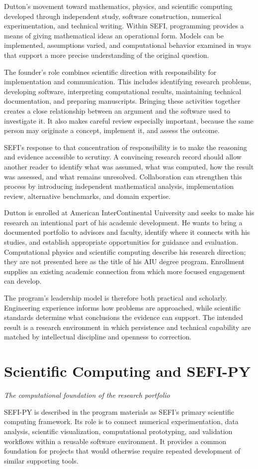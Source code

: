 \documentclass[10pt,letterpaper]{article}
\newcommand{\pageheading}[2]{\clearpage\section{#1}\textit{#2}\par\medskip}
\begin{document}
Dutton's movement toward mathematics, physics, and scientific computing developed through independent study, software construction, numerical experimentation, and technical writing. Within SEFI, programming provides a means of giving mathematical ideas an operational form. Models can be implemented, assumptions varied, and computational behavior examined in ways that support a more precise understanding of the original question.

The founder's role combines scientific direction with responsibility for implementation and communication. This includes identifying research problems, developing software, interpreting computational results, maintaining technical documentation, and preparing manuscripts. Bringing these activities together creates a close relationship between an argument and the software used to investigate it. It also makes careful review especially important, because the same person may originate a concept, implement it, and assess the outcome.

SEFI's response to that concentration of responsibility is to make the reasoning and evidence accessible to scrutiny. A convincing research record should allow another reader to identify what was assumed, what was computed, how the result was assessed, and what remains unresolved. Collaboration can strengthen this process by introducing independent mathematical analysis, implementation review, alternative benchmarks, and domain expertise.

Dutton is enrolled at American InterContinental University and seeks to make his research an intentional part of his academic development. He wants to bring a documented portfolio to advisors and faculty, identify where it connects with his studies, and establish appropriate opportunities for guidance and evaluation. Computational physics and scientific computing describe his research direction; they are not presented here as the title of his AIU degree program. Enrollment supplies an existing academic connection from which more focused engagement can develop.

The program's leadership model is therefore both practical and scholarly. Engineering experience informs how problems are approached, while scientific standards determine what conclusions the evidence can support. The intended result is a research environment in which persistence and technical capability are matched by intellectual discipline and openness to correction.

\pageheading{Scientific Computing and SEFI-PY}{The computational foundation of the research portfolio}
SEFI-PY is described in the program materials as SEFI's primary scientific computing framework. Its role is to connect numerical experimentation, data analysis, scientific visualization, computational prototyping, and validation workflows within a reusable software environment. It provides a common foundation for projects that would otherwise require repeated development of similar supporting tools.
\end{document}
